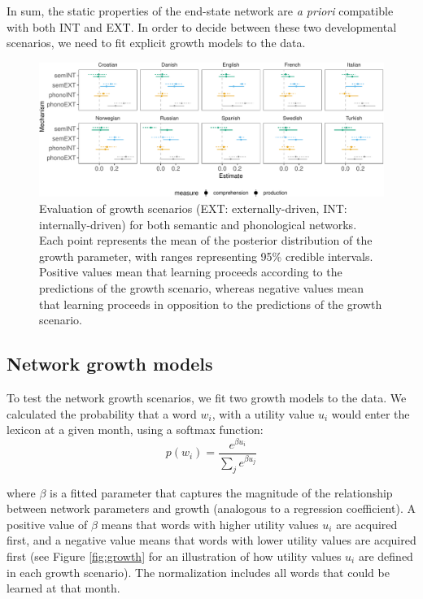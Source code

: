 \documentclass[english,,man,floatsintext]{apa6}
\begin{document}
In sum, the static properties of the end-state network are \emph{a priori} compatible with both INT and EXT. In order to decide between these two developmental scenarios, we need to fit explicit growth models to the data.

\begin{figure}[!h]
\includegraphics[width=\textwidth]{ms_files/figure-latex/growthPred-1} \caption{Evaluation of growth scenarios (EXT: externally-driven, INT: internally-driven) for both semantic and phonological networks. Each point represents the mean of the posterior distribution of the growth parameter, with ranges representing 95\% credible intervals. Positive values mean that learning proceeds according to the predictions of the growth scenario, whereas negative values mean that learning proceeds in opposition to the predictions of the growth scenario.}\label{fig:growthPred}
\end{figure}

\hypertarget{network-growth-models}{%
\subsection{Network growth models}\label{network-growth-models}}

To test the network growth scenarios, we fit two growth models to the data. We calculated the probability that a word \(w_i\), with a utility value \(u_i\) would enter the lexicon at a given month, using a softmax function:
\begin{equation}
 p(w_i)= \frac{e^{\beta u_i}}{\sum_j e^{\beta u_j} }
\end{equation}

\noindent where \(\beta\) is a fitted parameter that captures the magnitude of the relationship between network parameters and growth (analogous to a regression coefficient). A positive value of \(\beta\) means that words with higher utility values \(u_i\) are acquired first, and a negative value means that words with lower utility values are acquired first (see Figure \ref{fig:growth} for an illustration of how utility values \(u_i\) are defined in each growth scenario). The normalization includes all words that could be learned at that month.
\end{document}
